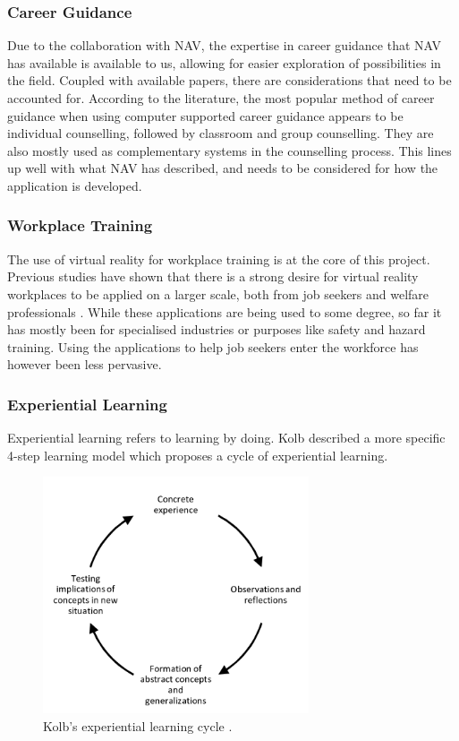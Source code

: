 \subsubsection{Career Guidance}
Due to the collaboration with NAV, the expertise in career guidance that NAV has available is available to us, allowing for easier exploration of possibilities in the field. Coupled with available papers, there are considerations that need to be accounted for. According to the literature, the most popular method of career guidance when using computer supported career guidance appears to be individual counselling, followed by classroom and group counselling. They are also mostly used as complementary systems in the counselling process\cite{sampson1987computer}. This lines up well with what NAV has described, and needs to be considered for how the application is developed. 



\subsubsection{Workplace Training}
The use of virtual reality for workplace training is at the core of this project. Previous studies have shown that there is a strong desire for virtual reality workplaces to be applied on a larger scale, both from job seekers and welfare professionals \cite{prasolova2019empowering}. While these applications are being used to some degree, so far it has mostly been for specialised industries or purposes like safety and hazard training. Using the applications to help job seekers enter the workforce has however been less pervasive. 

\subsubsection{Experiential Learning}
Experiential learning refers to learning by doing. Kolb described a more specific 4-step learning model which proposes a cycle of experiential learning\cite{kolb1974toward}. 

\begin{figure}
    \centering
    \includegraphics[width=0.7\textwidth]{./fig/background/kolbModel.png}
    \caption{Kolb's experiential learning cycle \cite{kolbModel}.}
    \label{fig:KolbModel}
\end{figure}

